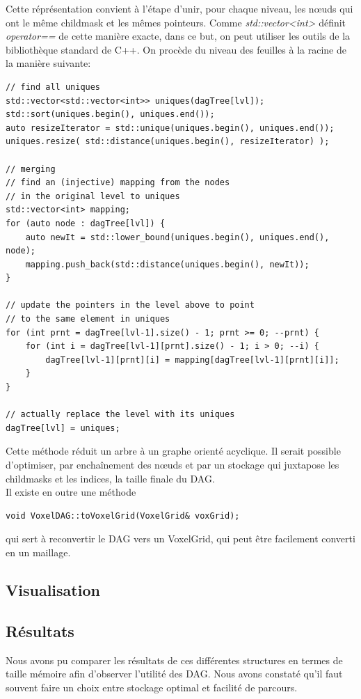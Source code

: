 \documentclass[a4paper]{article}
\begin{document}
Cette réprésentation convient à l'étape d'unir, pour chaque niveau, les nœuds qui ont le même childmask et les mêmes pointeurs. Comme \textit{std::vector<int>} définit \textit{operator==} de cette manière exacte, dans ce but, on peut utiliser les outils de la bibliothèque standard de C++. On procède du niveau des feuilles à la racine de la manière suivante: \\

\begin{lstlisting}
// find all uniques
std::vector<std::vector<int>> uniques(dagTree[lvl]);
std::sort(uniques.begin(), uniques.end());
auto resizeIterator = std::unique(uniques.begin(), uniques.end());
uniques.resize( std::distance(uniques.begin(), resizeIterator) );

// merging
// find an (injective) mapping from the nodes
// in the original level to uniques
std::vector<int> mapping;
for (auto node : dagTree[lvl]) {
    auto newIt = std::lower_bound(uniques.begin(), uniques.end(), node);
    mapping.push_back(std::distance(uniques.begin(), newIt));
}

// update the pointers in the level above to point
// to the same element in uniques
for (int prnt = dagTree[lvl-1].size() - 1; prnt >= 0; --prnt) {
    for (int i = dagTree[lvl-1][prnt].size() - 1; i > 0; --i) {
        dagTree[lvl-1][prnt][i] = mapping[dagTree[lvl-1][prnt][i]];
    }
}

// actually replace the level with its uniques
dagTree[lvl] = uniques;
\end{lstlisting}
Cette méthode réduit un arbre à un graphe orienté acyclique. Il serait possible d'optimiser, par enchaînement des nœuds et par un stockage qui juxtapose les childmasks et les indices, la taille finale du DAG.\\


Il existe en outre une méthode 
\begin{lstlisting}
void VoxelDAG::toVoxelGrid(VoxelGrid& voxGrid);
\end{lstlisting}
qui sert à reconvertir le DAG vers un VoxelGrid, qui peut être facilement converti en un maillage.

\subsection{Visualisation} %
\label{sub:visualisation}


\subsection{Résultats} %
\label{sub:r_sultats}
Nous avons pu comparer les résultats de ces différentes structures en termes de taille mémoire afin d'observer l'utilité des DAG. Nous avons constaté qu'il faut souvent faire un choix entre stockage optimal et facilité de parcours.
\end{document}
